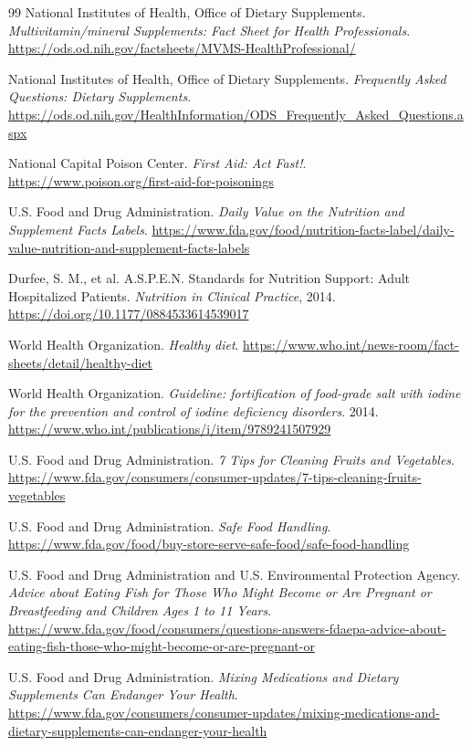 \begin{thebibliography}{99}
 National Institutes of Health, Office of Dietary Supplements. \emph{Multivitamin/mineral Supplements: Fact Sheet for Health Professionals}. \url{https://ods.od.nih.gov/factsheets/MVMS-HealthProfessional/}

 National Institutes of Health, Office of Dietary Supplements. \emph{Frequently Asked Questions: Dietary Supplements}. \url{https://ods.od.nih.gov/HealthInformation/ODS_Frequently_Asked_Questions.aspx}

 National Capital Poison Center. \emph{First Aid: Act Fast!}. \url{https://www.poison.org/first-aid-for-poisonings}

 U.S. Food and Drug Administration. \emph{Daily Value on the Nutrition and Supplement Facts Labels}. \url{https://www.fda.gov/food/nutrition-facts-label/daily-value-nutrition-and-supplement-facts-labels}

 Durfee, S. M., et al. A.S.P.E.N. Standards for Nutrition Support: Adult Hospitalized Patients. \emph{Nutrition in Clinical Practice}, 2014. \url{https://doi.org/10.1177/0884533614539017}

 World Health Organization. \emph{Healthy diet}. \url{https://www.who.int/news-room/fact-sheets/detail/healthy-diet}

 World Health Organization. \emph{Guideline: fortification of food-grade salt with iodine for the prevention and control of iodine deficiency disorders}. 2014. \url{https://www.who.int/publications/i/item/9789241507929}

 U.S. Food and Drug Administration. \emph{7 Tips for Cleaning Fruits and Vegetables}. \url{https://www.fda.gov/consumers/consumer-updates/7-tips-cleaning-fruits-vegetables}

 U.S. Food and Drug Administration. \emph{Safe Food Handling}. \url{https://www.fda.gov/food/buy-store-serve-safe-food/safe-food-handling}

 U.S. Food and Drug Administration and U.S. Environmental Protection Agency. \emph{Advice about Eating Fish for Those Who Might Become or Are Pregnant or Breastfeeding and Children Ages 1 to 11 Years}. \url{https://www.fda.gov/food/consumers/questions-answers-fdaepa-advice-about-eating-fish-those-who-might-become-or-are-pregnant-or}

 U.S. Food and Drug Administration. \emph{Mixing Medications and Dietary Supplements Can Endanger Your Health}. \url{https://www.fda.gov/consumers/consumer-updates/mixing-medications-and-dietary-supplements-can-endanger-your-health}


\end{thebibliography}
